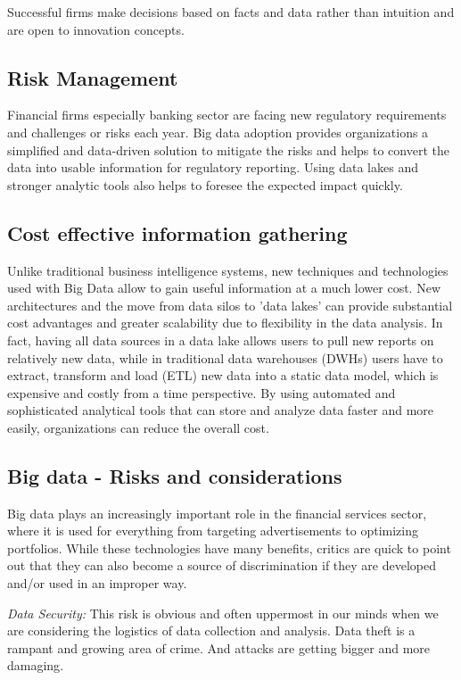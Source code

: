 \documentclass[sigconf]{acmart}
\begin{document}
Successful firms make decisions based on facts and data rather than intuition and are open to innovation concepts. 


\subsection{Risk Management}
Financial firms especially banking sector are facing new regulatory requirements and challenges or risks each year. Big data adoption provides organizations a simplified and data-driven solution to mitigate the risks and helps to convert the data into usable information for regulatory reporting. Using data lakes and stronger analytic tools   also helps to foresee the expected impact quickly\cite{https://www-935.ibm.com}.

\subsection{Cost effective information gathering}

Unlike traditional business intelligence systems, new techniques and technologies used with Big Data allow to gain useful information at a much lower cost. New architectures and the move from data silos to 'data lakes' can provide substantial cost advantages and greater scalability due to flexibility in the data analysis. In fact, having all data sources in a data lake allows users to pull new reports on relatively new data, while in traditional data warehouses (DWHs) users have to extract, transform and load (ETL) new data into a static data model, which is expensive and costly from a time perspective. By using automated and sophisticated analytical tools that can store and analyze data faster and more easily, organizations can reduce the overall cost\cite{Accenture-Next-Generation-Financial}.

\subsection{Big data - Risks and considerations}

Big data plays an increasingly important role in the financial services sector, where it is used for everything from targeting advertisements to optimizing portfolios. While these technologies have many benefits, critics are quick to point out that they can also become a source of discrimination if they are developed and/or used in an improper way\cite{risk-with-bigdata}.

\textit{Data Security:} This risk is obvious and often uppermost in our minds when we are considering the logistics of data collection and analysis. Data theft is a rampant and growing area of crime. And attacks are getting bigger and more damaging\cite{5risks-bigdata}.
\end{document}
